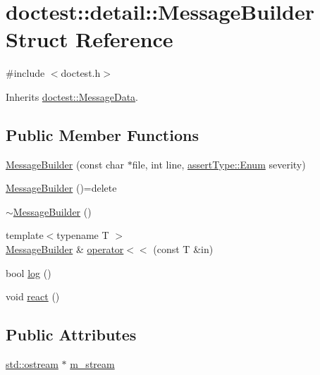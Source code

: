 \hypertarget{structdoctest_1_1detail_1_1_message_builder}{}\section{doctest\+:\+:detail\+:\+:Message\+Builder Struct Reference}
\label{structdoctest_1_1detail_1_1_message_builder}


{\ttfamily \#include $<$doctest.\+h$>$}



Inherits \mbox{\hyperlink{structdoctest_1_1_message_data}{doctest\+::\+Message\+Data}}.

\subsection*{Public Member Functions}
\begin{DoxyCompactItemize}
\item 
\mbox{\hyperlink{structdoctest_1_1detail_1_1_message_builder_a93cb6f180968d38cb0f18b08ec6c9000}{Message\+Builder}} (const char $\ast$file, int line, \mbox{\hyperlink{namespacedoctest_1_1assert_type_ae1bb5bed722f34f1c38b83cb19d326d3}{assert\+Type\+::\+Enum}} severity)
\item 
\mbox{\hyperlink{structdoctest_1_1detail_1_1_message_builder_aaaaf33f49c6d66425af9c2306010ae7e}{Message\+Builder}} ()=delete
\item 
\mbox{\hyperlink{structdoctest_1_1detail_1_1_message_builder_aa8dca00768780164f52e309276692f96}{$\sim$\+Message\+Builder}} ()
\item 
{\footnotesize template$<$typename T $>$ }\\\mbox{\hyperlink{structdoctest_1_1detail_1_1_message_builder}{Message\+Builder}} \& \mbox{\hyperlink{structdoctest_1_1detail_1_1_message_builder_ab9059f961c58179c998c89fc221ec804}{operator$<$$<$}} (const T \&in)
\item 
bool \mbox{\hyperlink{structdoctest_1_1detail_1_1_message_builder_a9bcc5d56e1764a7e07efebca55e43cce}{log}} ()
\item 
void \mbox{\hyperlink{structdoctest_1_1detail_1_1_message_builder_a3a65c5e39a0c04ae8e2a7c34997a2e4d}{react}} ()
\end{DoxyCompactItemize}
\subsection*{Public Attributes}
\begin{DoxyCompactItemize}
\item 
\mbox{\hyperlink{doctest_8h_a116af65cb5e924b33ad9d9ecd7a783f3}{std\+::ostream}} $\ast$ \mbox{\hyperlink{structdoctest_1_1detail_1_1_message_builder_a5319d522ba62c91e59ffa7f6982756e5}{m\+\_\+stream}}
\end{DoxyCompactItemize}


